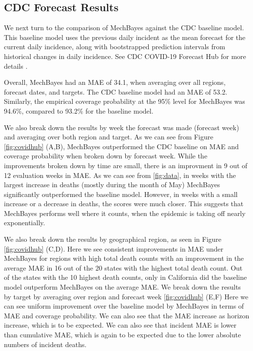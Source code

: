\documentclass[11pt]{amsart}
\begin{document}
\subsection{CDC Forecast Results}

We next turn to the comparison of MechBayes against the CDC baseline model. This baseline model uses the previous daily incident as the mean forecast for the current daily incidence, along with  bootstrapped prediction intervals from historical changes in daily incidence. See CDC COVID-19 Forecast Hub for more details \cite{covidhub}. 

Overall, MechBayes had an MAE of 34.1, when averaging over all regions, forecast dates, and targets. The CDC baseline model had an MAE of 53.2. Similarly, the empirical coverage probability at the 95\% level for MechBayes was 94.6\%, compared to 93.2\% for the baseline model.

 We also break down the results by week the forecast was made (forecast week) and averaging over both region and target. As we can see from Figure \ref{fig:covidhub} (A,B), MechBayes outperformed the CDC baseline on MAE and coverage probability when broken down by forecast week. While the improvements broken down by time are small, there is an improvment in 9 out of 12 evaluation weeks in MAE.  As we can see from \ref{fig:data}, in weeks with the largest increase in deaths (mostly during the month of May) MechBayes significantly outperformed the baseline model. However, in weeks with a small increase or a decrease in deaths, the scores were much closer. This suggests that MechBayes performs well where it counts, when the epidemic is taking off nearly exponentially. 

We also break down the results by geographical region, as seen in Figure \ref{fig:covidhub} (C,D). Here we see consistent improvements in MAE under MechBayes for regions with high total death counts with an improvement in the average MAE in 16 out of the 20 states with the highest total death count. Out of the states with the 10 highest death counts, only in California did the baseline model outperform MechBayes on the average MAE. 
We break down the results by target by averaging over region and forecast week  \ref{fig:covidhub} (E,F) Here we can see uniform improvement over the baseline model by MechBayes in terms of MAE and coverage probability. We can also see that the MAE increase as horizon increase, which is to be expected. We can also see that incident MAE is lower than cumulative MAE, which is again to be expected due to the lower absolute numbers of incident deaths. 
\end{document}
